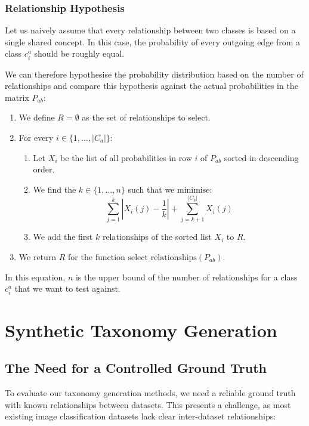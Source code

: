 \subsubsection{Relationship Hypothesis}

Let us naively assume that every relationship between two classes
is based on a single shared concept.
In this case, the probability of every outgoing edge from a class $c_i^a$
should be roughly equal.

We can therefore hypothesise the probability distribution based on the number of relationships
and compare this hypothesis against the actual probabilities in the matrix $P_{ab}$:
\begin{enumerate}
    \item We define $R=\emptyset$ as the set of relationships to select.
    \item For every $i\in \{1, \ldots, |C_a|\}$:
          \begin{enumerate}
              \item Let $X_i$ be the list of all probabilities in row $i$ of $P_{ab}$ sorted in descending order.
              \item We find the $k\in\{1, \ldots, n\}$ such that we minimise:
                    \begin{equation*}
                        \sum_{j=1}^k \left| X_i(j) - \frac{1}{k} \right| + \sum_{j=k+1}^{|C_b|} X_i(j)
                    \end{equation*}
              \item We add the first $k$ relationships of the sorted list $X_i$ to $R$.
          \end{enumerate}
    \item We return $R$ for the function $\text{select\_relationships}(P_{ab})$.
\end{enumerate}

In this equation, $n$ is the upper bound of the number of relationships
for a class $c_i^a$ that we want to test against.

\section{Synthetic Taxonomy Generation}

\subsection{The Need for a Controlled Ground Truth}

To evaluate our taxonomy generation methods, we need a reliable ground truth with known relationships between datasets. This presents a challenge, as most existing image classification datasets lack clear inter-dataset relationships:

